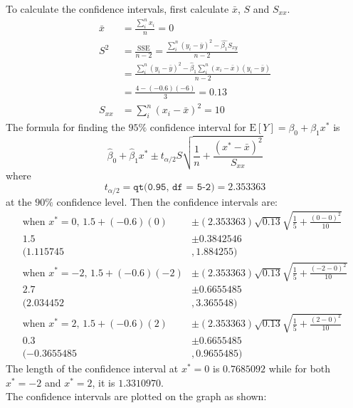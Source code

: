 \documentclass[12pt]{article}
\begin{document}
To calculate the confidence intervals, first calculate $\bar{x}$, $S$ and $S_{xx}$. 
$$ \begin{aligned} \bar{x} &= \frac{\sum_i^n x_i}{n} = 0 \\ S^2 &= \frac{\text{SSE}}{n-2} = \frac{\sum_i^n (y_i - \bar{y})^2 - \hat{\beta_1}S_{xy}}{n-2} \\ &= \frac{\sum_i^n (y_i - \bar{y})^2 - \hat{\beta}_1 \sum_i^n (x_i - \bar{x})(y_i - \bar{y})}{n-2} \\ &= \frac{4 - (-0.6)(-6)}{3} = 0.13 \\ S_{xx} &= \sum_i^n (x_i - \bar{x})^2 = 10 \end{aligned} $$ 
The formula for finding the $95\%$ confidence interval for $\mathrm{E}[Y] = \beta_0 + \beta_1x^*$ is
$$ \hat{\beta}_0 + \hat{\beta}_1x^* \pm t_{\alpha/2} S \sqrt{ \frac{1}{n} + \frac{(x^* - \bar{x})^2}{S_{xx}}} $$ where $$t_{\alpha / 2} = \texttt{qt(0.95, df = 5-2)} =  2.353363$$ at the $90\%$ confidence level. Then the confidence intervals are: 
$$ \begin{aligned} \text{when $x^* = 0$, } 1.5 + (-0.6)(0) &\pm (2.353363)\sqrt{0.13} \sqrt{ \frac{1}{5} + \frac{(0-0)^2}{10}} \\ 1.5 &\pm 0.3842546 \\ (1.115745 &, 1.884255) \\ 
\text{when $x^* = -2$, } 1.5 + (-0.6)(-2) &\pm (2.353363)\sqrt{0.13} \sqrt{ \frac{1}{5} + \frac{(-2-0)^2}{10}} \\ 2.7 &\pm 0.6655485 \\ (2.034452 &, 3.365548) \\
\text{when $x^* = 2$, } 1.5 + (-0.6)(2) &\pm (2.353363)\sqrt{0.13} \sqrt{ \frac{1}{5} + \frac{(2-0)^2}{10}} \\ 0.3 &\pm 0.6655485 \\ (-0.3655485 &, 0.9655485) \end{aligned} $$ 
The length of the confidence interval at $x^* = 0$ is $0.7685092$ while for both $x^* = -2$ and $x^* = 2$, it is $1.3310970$. \\
The confidence intervals are plotted on the graph as shown: 
\end{document}
